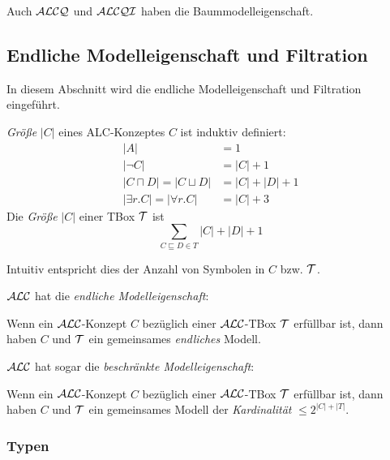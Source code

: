 Auch $\mathcal{A}\mathcal{L}\mathcal{C}\mathcal{Q}$ und $\mathcal{A}\mathcal{L}\mathcal{C}\mathcal{Q}\mathcal{I}$ haben die Baummodelleigenschaft.

\subsection{Endliche Modelleigenschaft und Filtration}
\label{ausdrucksstuxe4rke-und-modellkonstruktion}

In diesem Abschnitt wird die endliche Modelleigenschaft und Filtration eingeführt.

\begin{definition}[Größe]
\emph{Größe} $\left| C \right|$ eines ALC-Konzeptes $C$ ist induktiv
definiert:
\begin{align*}
    \left| A \right| &= 1\\
    \left| \neg C \right| &= \left| C \right| + 1\\
    \left| C \sqcap D \right| = \left| C \sqcup D \right| &= \left| C \right| + \left| D \right| + 1\\
    \left| \exists r.C \right| = \left| \forall r.C \right| &= \left| C \right| + 3
\end{align*}
Die \emph{Größe} $\left| C \right|$ einer TBox $\mathcal{T}$ ist
\[
  \sum_{C \sqsubseteq D \in T} \left| C \right| + \left| D \right| + 1
  \]
\end{definition}

Intuitiv entspricht dies der Anzahl von Symbolen in $C$ bzw. $\mathcal{T}$.

$\mathcal{A}\mathcal{L}\mathcal{C}$ hat die \emph{endliche Modelleigenschaft}:

\begin{theorem}
Wenn ein $\mathcal{A}\mathcal{L}\mathcal{C}$-Konzept $C$ bezüglich einer $\mathcal{A}\mathcal{L}\mathcal{C}$-TBox $\mathcal{T}$ erfüllbar ist, dann haben $C$ und $\mathcal{T}$ ein gemeinsames \emph{endliches} Modell.
\end{theorem}

$\mathcal{A}\mathcal{L}\mathcal{C}$ hat sogar die \emph{beschränkte Modelleigenschaft}:

\begin{theorem}
Wenn ein $\mathcal{A}\mathcal{L}\mathcal{C}$-Konzept $C$ bezüglich einer $\mathcal{A}\mathcal{L}\mathcal{C}$-TBox $\mathcal{T}$ erfüllbar ist, dann haben $C$ und $\mathcal{T}$ ein gemeinsames Modell der \emph{Kardinalität} $\leq 2^{|C|+|T|}$.
\end{theorem}

\subsubsection{Typen}
\label{sec:typ}

